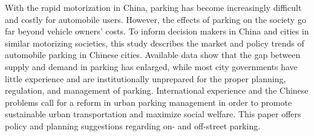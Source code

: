 With the rapid motorization in China, parking has become increasingly difficult and costly for automobile users. However, the effects of parking on the society go far beyond vehicle owners' costs. To inform decision makers in China and cities in similar motorizing societies, this study describes the market and policy trends of automobile parking in Chinese cities. Available data show that the gap between supply and demand in parking has enlarged, while most city governments have little experience and are institutionally unprepared for the proper planning, regulation, and management of parking. International experience and the Chinese problems call for a reform in urban parking management in order to promote sustainable urban transportation and maximize social welfare. This paper offers policy and planning suggestions regarding on- and off-street parking.
